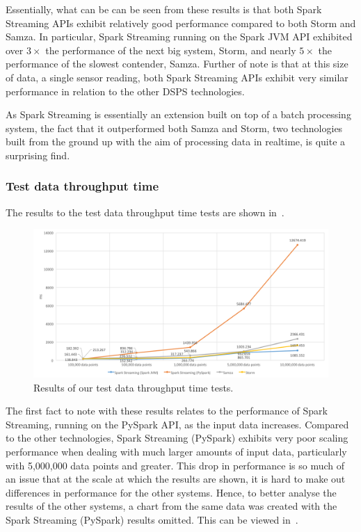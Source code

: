 Essentially, what can be can be seen from these results is that both Spark Streaming APIs exhibit relatively good performance
compared to both Storm and Samza. In particular, Spark Streaming running on the Spark JVM API exhibited over $3\times$ the
performance of the next big system, Storm, and nearly $5\times$ the performance of the slowest contender, Samza. Further of
note is that at this size of data, a single sensor reading, both Spark Streaming APIs exhibit very similar performance
in relation to the other DSPS technologies.

As Spark Streaming is essentially an extension built on top of a batch processing system, the fact that it outperformed
both Samza and Storm, two technologies built from the ground up with the aim of processing data in realtime, is quite a
surprising find.

\subsubsection{Test data throughput time}

The results to the test data throughput time tests are shown in~.

\begin{figure}[ht]
  \centering
  \includegraphics[width=1\textwidth]{includes/figures/fig_throughput_res}
  \caption{Results of our test data throughput time tests.}
  \label{fig:throughput_time_res}
\end{figure}

The first fact to note with these results relates to the performance of Spark Streaming, running on the PySpark API, as the
input data increases. Compared to the other technologies, Spark Streaming (PySpark) exhibits very poor scaling performance
when dealing with much larger amounts of input data, particularly with 5,\@000,\@000 data points and greater. This drop in
performance is so much of an issue that at the scale at which the results are shown, it is hard to make out differences in
performance for the other systems. Hence, to better analyse the results of the other systems, a chart from the same
data was created with the Spark Streaming (PySpark) results omitted. This can be viewed in~.

